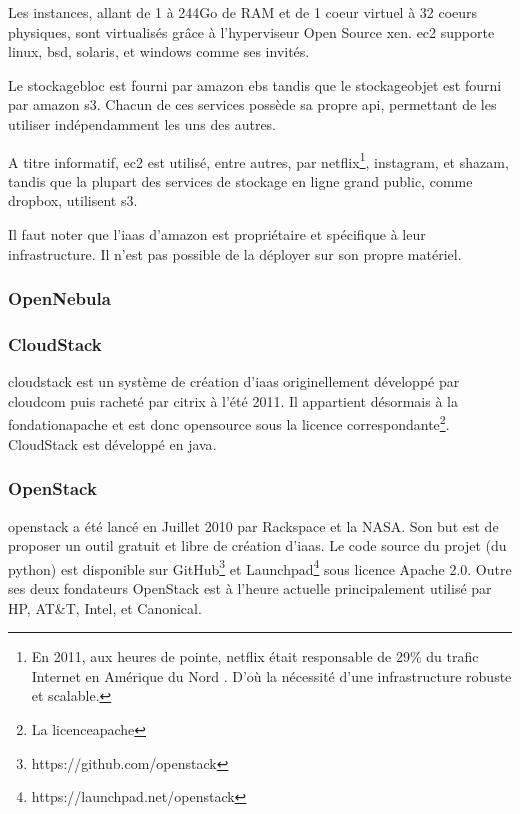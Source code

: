 \documentclass[a4paper,oneside]{report}
\begin{document}
Les instances, allant de 1 à 244Go de RAM et de 1 \gls{coeur} virtuel à 32 \glspl{coeur} physiques, sont virtualisés grâce à l'hyperviseur Open Source \gls{xen}.
\gls{ec2} supporte \gls{linux}, \gls{bsd}, \gls{solaris}, et \gls{windows} comme \glspl{se} invités.

Le \gls{stockagebloc} est fourni par \gls{amazon} \gls{ebs} tandis que le \gls{stockageobjet} est fourni par \gls{amazon} \gls{s3}.
Chacun de ces services possède sa propre \gls{api}, permettant de les utiliser indépendamment les uns des autres.

A titre informatif, \gls{ec2} est utilisé, entre autres, par \gls{netflix}\footnote{En 2011, aux heures de pointe, \gls{netflix} était responsable de 29\% du trafic Internet en Amérique du Nord \cite{NetflixTrafic}. D'où la nécessité d'une infrastructure robuste et scalable.}, \gls{instagram}, et \gls{shazam}, tandis que la plupart des services de stockage en ligne grand public, comme \gls{dropbox}, utilisent \gls{s3}.

Il faut noter que l'\gls{iaas} d'\gls{amazon} est propriétaire et spécifique à leur infrastructure. Il n'est pas possible de la déployer sur son propre matériel.

\subsubsection{OpenNebula}

\subsubsection{CloudStack}
\gls{cloudstack} est un système de création d'\gls{iaas} originellement développé par \gls{cloudcom} puis racheté par \gls{citrix} à l'été 2011.
Il appartient désormais à la \gls{fondationapache} et est donc \gls{opensource} sous la licence correspondante\footnote{La \gls{licenceapache}}.\newline
CloudStack est développé en \gls{java}.

\subsubsection{OpenStack}
\gls{openstack} a été lancé en Juillet 2010 par Rackspace et la NASA.
Son but est de proposer un outil gratuit et libre de création d'\gls{iaas}.
Le code source du projet (du \gls{python}) est disponible sur GitHub\footnote{https://github.com/openstack} et Launchpad\footnote{https://launchpad.net/openstack} sous licence Apache 2.0.\newline
Outre ses deux fondateurs OpenStack est à l'heure actuelle principalement utilisé par HP, AT\&T, Intel, et Canonical.
\end{document}
